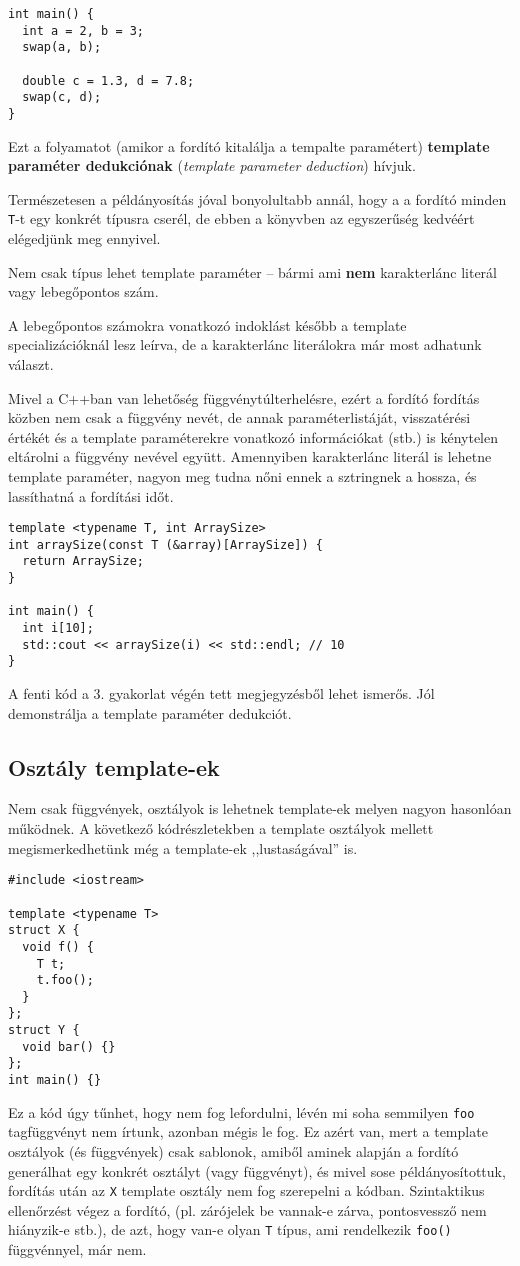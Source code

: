 \documentclass[../cpp_book/cpp_book.tex]{subfiles}
\begin{document}
	\begin{lstlisting}
int main() {
  int a = 2, b = 3;
  swap(a, b);

  double c = 1.3, d = 7.8;
  swap(c, d);
}
	\end{lstlisting}
	Ezt a folyamatot (amikor a fordító kitalálja a tempalte paramétert) \textbf{template paraméter dedukciónak} (\textit{template parameter deduction}) hívjuk.
	\begin{note}
		Természetesen a példányosítás jóval bonyolultabb annál, hogy a a fordító minden \texttt{T}-t egy konkrét típusra cserél, de ebben a könyvben az egyszerűség kedvéért elégedjünk meg ennyivel.
	\end{note}
	Nem csak típus lehet template paraméter -- bármi ami \textbf{nem} karakterlánc literál vagy lebegőpontos szám.
	\begin{note}
		A lebegőpontos számokra vonatkozó indoklást később a template specializációknál lesz leírva, de a karakterlánc literálokra már most adhatunk választ.
		
		Mivel a C++ban van lehetőség függvénytúlterhelésre, ezért a fordító fordítás közben nem csak a függvény nevét, de annak paraméterlistáját, visszatérési értékét és a template paraméterekre vonatkozó információkat (stb.) is kénytelen eltárolni a függvény nevével együtt. Amennyiben karakterlánc literál is lehetne template paraméter, nagyon meg tudna nőni ennek a sztringnek a hossza, és lassíthatná a fordítási időt.
	\end{note}
	\begin{lstlisting}
template <typename T, int ArraySize>
int arraySize(const T (&array)[ArraySize]) {
  return ArraySize;
}

int main() {
  int i[10];
  std::cout << arraySize(i) << std::endl; // 10
}
	\end{lstlisting}
	A fenti kód a 3. gyakorlat végén tett megjegyzésből lehet ismerős. Jól demonstrálja a template paraméter dedukciót.
	\subsection{Osztály template-ek}
	Nem csak függvények, osztályok is lehetnek template-ek melyen nagyon hasonlóan működnek. A következő kódrészletekben a template osztályok mellett megismerkedhetünk még a template-ek ,,lustaságával'' is.
	\begin{lstlisting}
#include <iostream>

template <typename T>
struct X {
  void f() {
    T t;
    t.foo();
  }
};
struct Y {
  void bar() {}
};
int main() {}
	\end{lstlisting}
	Ez a kód úgy tűnhet, hogy nem fog lefordulni, lévén mi soha semmilyen \texttt{foo} tagfüggvényt nem írtunk, azonban mégis le fog. Ez azért van, mert a template osztályok (és függvények) csak sablonok, amiből aminek alapján a fordító generálhat egy konkrét osztályt (vagy függvényt), és mivel sose példányosítottuk, fordítás után az \texttt{X} template osztály nem fog szerepelni a kódban. Szintaktikus ellenőrzést végez a fordító, (pl. zárójelek be vannak-e zárva, pontosvessző nem hiányzik-e stb.), de azt, hogy van-e olyan \texttt{T} típus, ami rendelkezik \texttt{foo()} függvénnyel, már nem.
	
\end{document}

